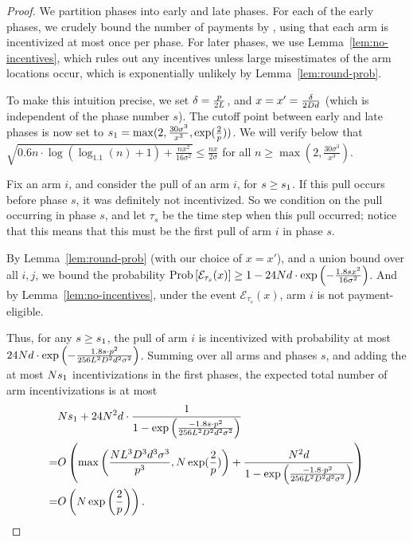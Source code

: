 \begin{proof}
We partition phases into early and late phases.
For each of the early phases,
we crudely bound the number of payments by \ARMNUM,
using that each arm is incentivized at most once per phase.
For later phases,
we use Lemma~\ref{lem:no-incentives},
which rules out any incentives unless large misestimates of the arm
locations occur, which is exponentially unlikely by 
Lemma~\ref{lem:round-prob}.

To make this intuition precise, we set
$\delta = \frac{p}{2 L}$,
and $x = x' = \frac{\delta}{2 D d}$
(which is independent of the phase number $s$).
The cutoff point between early and late phases is now set to
$s_1 = \max(2, \frac{30 \sigma^3}{x^3}, \exp(\frac{2}{p}))$.
We will verify below that
$\sqrt{0.6 n \cdot \log (\log_{1.1}(n) + 1) + \frac{n x^2}{16 \sigma^2}}
\leq \frac{n x}{2 \sigma}$
for all $n \geq \max(2, \frac{30 \sigma^3}{x^3})$.

Fix an arm $i$, and consider the  pull of an arm $i$,
for $s \geq s_1$.
If this pull occurs before phase $s$, it was definitely not incentivized.
So we condition on the pull occurring in phase $s$,
and let $\tau_s$ be the time step when this pull occurred;
notice that this means that this must be the first pull of arm $i$ in
phase $s$.

By Lemma~\ref{lem:round-prob} (with our choice of $x = x'$),
and a union bound over all $i,j$, we bound the probability
$\Prob{\AccEU{\tau_s}{x}}
\geq 1 - 24 \ARMNUM d \cdot \exp\left(-\frac{1.8 s x^2}{16 \sigma^2} \right)$.
And by Lemma~\ref{lem:no-incentives},
under the event ${\mathcal E}_{\tau_s}(x)$,
arm $i$ is not payment-eligible.

Thus, for any $s \geq s_1$,
the  pull of arm $i$ is incentivized  
with probability at most
$24 N d \cdot \exp \left(
  -\frac{1.8 s \cdot p^2}{256 L^2 D^2 d^2 \sigma^2}
\right)$.
Summing over all arms and phases $s$,
and adding the at most $N s_1$ incentivizations in
the first \EvenLaterPhase phases, 
the expected total number of arm incentivizations is at most
\begin{align*}
&N s_1
  + 24 N^2 d \cdot \frac{1}{1 - \exp \left(
    \frac{-1.8 s \cdot p^2}{256 L^2 D^2 d^2 \sigma^2}
  \right)} \nonumber \\
=& O\left( \max\left(\frac{N L^3 D^3 d^3 \sigma^3}{p^3}, N\exp(\frac{2}{p})\right)
  + \frac{N^2 d}{1 - \exp \left(
    \frac{-1.8 \cdot p^2}{256 L^2 D^2 d^2 \sigma^2}
  \right)} \right) \nonumber  \\
=& O\left( N\exp\left(\frac{2}{p}\right) \right).
\end{align*}


\end{proof}
